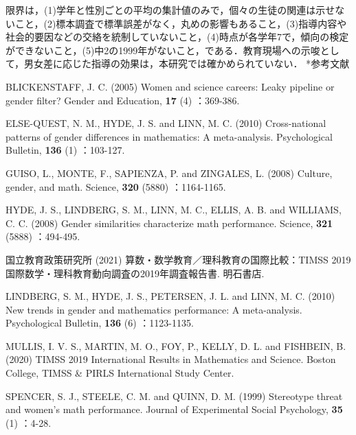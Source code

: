 \documentclass[a4paper,10pt,twocolumn]{ltjsarticle}
\makeatletter
\renewcommand{\section}{\@startsection{section}{1}{\z@}{1.1\Cvs \@plus.4\Cdp \@minus.2\Cdp}{.5\Cvs \@plus.2\Cdp}{\normalfont\gtfamily\bfseries\large}}
\makeatother
\begin{document}
限界は，(1)学年と性別ごとの平均の集計値のみで，個々の生徒の関連は示せないこと，(2)標本調査で標準誤差がなく，丸めの影響もあること，(3)指導内容や社会的要因などの交絡を統制していないこと，(4)時点が各学年7で，傾向の検定ができないこと，(5)中2の1999年がないこと，である．教育現場への示唆として，男女差に応じた指導の効果は，本研究では確かめられていない．
\section*{参考文献}
\begingroup\scriptsize\raggedright{} 
\begin{list}{}{\setlength{\leftmargin}{1.5\zw}\setlength{\itemindent}{-1.5\zw}\setlength{\labelwidth}{0pt}\setlength{\labelsep}{0pt}\setlength{\itemsep}{1pt}\setlength{\parsep}{0pt}\setlength{\topsep}{0pt}\setlength{\listparindent}{0pt}}
\item BLICKENSTAFF, J. C. (2005) Women and science careers: Leaky pipeline or gender filter? Gender and Education, \textbf{17} (4) ：369-386.
\item ELSE-QUEST, N. M., HYDE, J. S. and LINN, M. C. (2010) Cross-national patterns of gender differences in mathematics: A meta-analysis. Psychological Bulletin, \textbf{136} (1) ：103-127.
\item GUISO, L., MONTE, F., SAPIENZA, P. and ZINGALES, L. (2008) Culture, gender, and math. Science, \textbf{320} (5880) ：1164-1165.
\item HYDE, J. S., LINDBERG, S. M., LINN, M. C., ELLIS, A. B. and WILLIAMS, C. C. (2008) Gender similarities characterize math performance. Science, \textbf{321} (5888) ：494-495.
\item 国立教育政策研究所 (2021) 算数・数学教育／理科教育の国際比較：TIMSS 2019 国際数学・理科教育動向調査の2019年調査報告書. 明石書店.
\item LINDBERG, S. M., HYDE, J. S., PETERSEN, J. L. and LINN, M. C. (2010) New trends in gender and mathematics performance: A meta-analysis. Psychological Bulletin, \textbf{136} (6) ：1123-1135.
\item MULLIS, I. V. S., MARTIN, M. O., FOY, P., KELLY, D. L. and FISHBEIN, B. (2020) TIMSS 2019 International Results in Mathematics and Science. Boston College, TIMSS \& PIRLS International Study Center.
\item SPENCER, S. J., STEELE, C. M. and QUINN, D. M. (1999) Stereotype threat and women's math performance. Journal of Experimental Social Psychology, \textbf{35} (1) ：4-28.
\end{list}\endgroup
\end{document}
